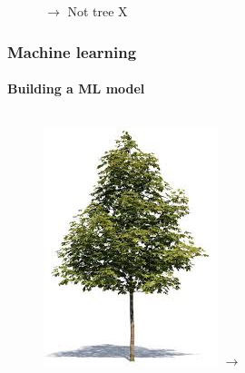 \documentclass[aspectratio=43]{beamer}
\begin{document}
\begin{frame}
\begin{figure}
		\endminipage
		\hspace*{0.75cm}
		$\longrightarrow$
		{\color{darkred}Not tree X}
		\endminipage
		
	\end{figure}

\end{frame}

\begin{frame}
	
	\frametitle{Machine learning}
	\framesubtitle{Building a ML model}
	
	\begin{figure}
		
		\begin{columns}
			\includegraphics[width = \linewidth]{plots/tree3.jpeg}
			$\longrightarrow$
		\end{columns}

\end{figure}
\end{frame}
\end{document}
